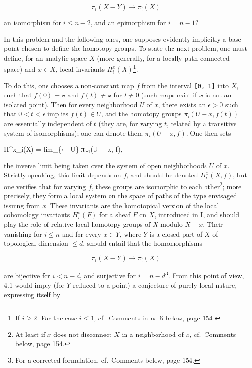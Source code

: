 \documentclass[
  11pt,
  a4paper,
]{book}
\newenvironment{Shaded}{}{}
\newcommand{\NormalTok}[1]{#1}
\begin{document}
\[ \pi_{i}(X - Y) \to \pi_{i}(X) \]

an isomorphism for \(i \leqslant n - 2\), and an epimorphism for
\(i = n - 1\)?

In this problem and the following ones, one supposes evidently
implicitly a base-point chosen to define the homotopy groups. To state
the next problem, one must define, for an analytic space \(X\) (more
generally, for a locally path-connected space) and \(x \in X\), local
invariants \(\Pi^{x}_{i}(X)\)\footnote{If \(i \geqslant 2\). For the
  case \(i \leqslant 1\), cf.~Comments in no 6 below, page 154.}.

To do this, one chooses a non-constant map \(f\) from the interval
\texttt{{[}0,\ 1{]}} into \(X\), such that \(f(0) = x\) and \(f(t) \neq
x\) for \(t \neq 0\) (such maps exist if \(x\) is not an isolated
point). Then for every neighborhood \(U\) of \(x\), there exists an
\(\epsilon > 0\) such that \(0 < t < \epsilon\) implies \(f(t) \in U\),
and the homotopy groups \(\pi_{i}(U - x,
f(t))\) are essentially independent of \(t\) (they are, for varying
\(t\), related by a transitive system of isomorphisms); one can denote
them \(\pi_{i}(U - x, f)\). One then sets

\begin{Shaded}
\begin{Highlighting}[]
\NormalTok{Π\^{}x\_i(X) = lim\_\{← U\} πᵢ₋₁(U − x, f),}
\end{Highlighting}
\end{Shaded}

the inverse limit being taken over the system of open neighborhoods
\(U\) of \(x\). Strictly speaking, this limit depends on \(f\), and
should be denoted \(\Pi^{x}_{i}(X, f)\), but one verifies that for
varying \(f\), these groups are isomorphic to each other\footnote{At
  least if \(x\) does not disconnect \(X\) in a neighborhood of \(x\),
  cf.~Comments below, page 154.}; more precisely, they form a local
system on the space of paths of the type envisaged issuing from \(x\).
These invariants are the homotopical version of the local cohomology
invariants \(H^{x}_{i}(F)\) for a sheaf \(F\) on \(X\), introduced in I,
and should play the role of relative local homotopy groups of \(X\)
modulo \(X - x\). Their vanishing for \(i \leqslant n\) and for every
\(x \in Y\), where \(Y\) is a closed part of \(X\) of topological
dimension \(\leqslant d\), should entail that the homomorphisms

\[ \pi_{i}(X - Y) \to \pi_{i}(X) \]

are bijective for \(i < n - d\), and surjective for
\(i = n - d\)\footnote{For a corrected formulation, cf.~Comments below,
  page 154.}. From this point of view, 4.1 would imply (for \(Y\)
reduced to a point) a conjecture of purely local nature, expressing
itself by
\end{document}
